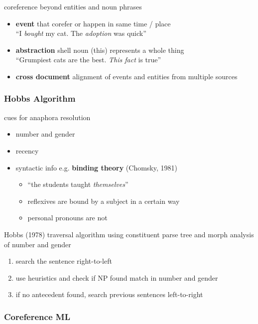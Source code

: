 \documentclass[]{article}
\theoremstyle{definition}
\begin{document}
coreference beyond entities and noun phrases
\begin{itemize}
    \item \textbf{event} that corefer or happen in same time / place \\ ``I \textit{bought} my cat. The \textit{adoption} was quick''
    \item \textbf{abstraction} shell noun (this) represents a whole thing  \\ ``Grumpiest cats are the best. \textit{This fact} is true''
    \item \textbf{cross document} alignment of events and entities from multiple sources
\end{itemize}

\subsubsection{Hobbs Algorithm}%
\label{ssub:hobbs_algorithm}

cues for anaphora resolution
\begin{itemize}
    \item number and gender
    \item recency
    \item syntactic info e.g. \textbf{binding theory} (Chomsky, 1981)
        \begin{itemize}
            \item ``the students taught \textit{themselves}''
            \item reflexives are bound by a subject in a certain way
            \item personal pronouns are not
        \end{itemize}
\end{itemize}

Hobbs (1978) traversal algorithm using constituent parse tree and morph analysis of number and gender
\begin{enumerate}
    \item search the sentence right-to-left
    \item use heuristics and check if NP found match in number and gender
    \item if no antecedent found, search previous sentences left-to-right
\end{enumerate}


\subsubsection{Coreference ML}%
\label{ssub:coreference_ml}
\end{document}
